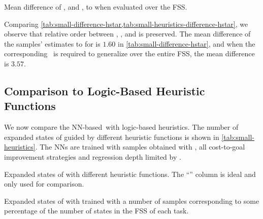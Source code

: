 \begin{table}[ht]
    \caption[Mean difference of heuristics to \hstar when evaluated over the FSS.]{Mean difference of \hff, \hgc and \hnn, to \hstar when evaluated over the FSS.}
    \label{tab:small-heuristics-difference-hstar}
    \addmargin
    \centering
    
\end{table}

Comparing \cref{tab:small-difference-hstar,tab:small-heuristics-difference-hstar}, we observe that relative order between \rldefault, \rlfacts, and \rlmeanfx is preserved. The mean difference of the samples' estimates to \hstar for \rlmeanfx is $1.60$ in \cref{tab:small-difference-hstar}, and when the corresponding~\hnnl{\rlmeanfx} is required to generalize over the entire FSS, the mean difference is $3.57$.

\subsection{Comparison to Logic-Based Heuristic Functions}
\label{sec:small-exps-hvalue-comparison}

We now compare the NN-based~\hnn with logic-based heuristics. The number of expanded states of \gbfs guided by different heuristic functions is shown in \cref{tab:small-heuristics}. The NNs are trained with samples obtained with \bfsrw, all cost-to-goal improvement strategies and regression depth limited by \rlmeanfx.  

\begin{table}[ht]
    \caption[Expanded states of different heuristic functions.]{Expanded states of \gbfs with different heuristic functions. The ``\hstar'' column is ideal and only used for comparison.}
    \addmargin
    \label{tab:small-heuristics}
    \centering
    
\end{table}

\begin{table}[ht]
    \caption[Expanded states from different sample set sizes.]{Expanded states of \gbfs with \hnnl{\rlmeanfx} trained with a number of samples corresponding to some percentage of the number of states in the FSS of each task.}
    \label{tab:small-sample-pct}
    \addmargin
    \centering
    
\end{table}

